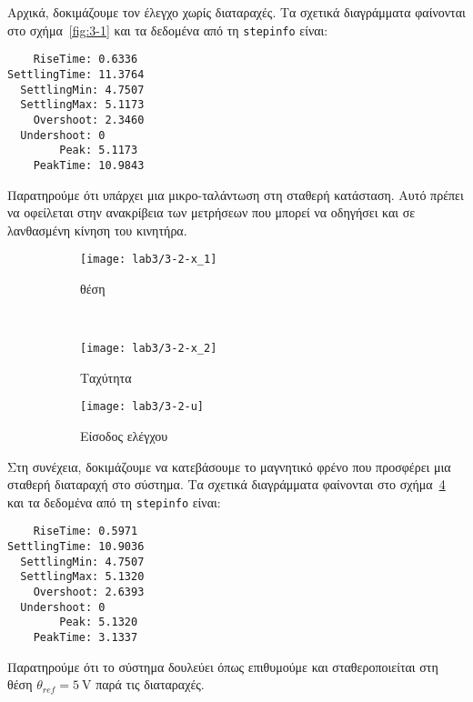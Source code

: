 Αρχικά, δοκιμάζουμε τον έλεγχο χωρίς διαταραχές.
Τα σχετικά διαγράμματα φαίνονται στο σχήμα~\ref{fig:3-1} και τα δεδομένα από τη \texttt{stepinfo} είναι:
\begin{code}
\begin{verbatim}
    RiseTime: 0.6336
SettlingTime: 11.3764
  SettlingMin: 4.7507
  SettlingMax: 5.1173
    Overshoot: 2.3460
  Undershoot: 0
        Peak: 5.1173
    PeakTime: 10.9843
\end{verbatim}
\end{code}
Παρατηρούμε ότι υπάρχει μια μικρο-ταλάντωση στη σταθερή κατάσταση.
Αυτό πρέπει να οφείλεται στην ανακρίβεια των μετρήσεων που μπορεί να οδηγήσει και σε λανθασμένη κίνηση του κινητήρα.

\begin{figure}[htbp]
  \centering
  \begin{subfigure}[t]{\linewidth}
    \texttt{[image: lab3/3-2-x\_1]}
    \caption{θέση}
    \label{fig:3-2-x_1}
  \end{subfigure}\\
  \begin{subfigure}[t]{0.45\linewidth}
    \texttt{[image: lab3/3-2-x\_2]}
    \caption{Ταχύτητα}
    \label{fig:3-2-x_2}
  \end{subfigure}\hfill
  \begin{subfigure}[t]{0.45\linewidth}
    \texttt{[image: lab3/3-2-u]}
    \caption{Είσοδος ελέγχου}
    \label{fig:3-2-u}
  \end{subfigure}
  \caption[]{}
  \label{fig:3-2}
\end{figure}

Στη συνέχεια, δοκιμάζουμε να κατεβάσουμε το μαγνητικό φρένο που προσφέρει μια σταθερή διαταραχή στο σύστημα.
Τα σχετικά διαγράμματα φαίνονται στο σχήμα~\ref{fig:3-2} και τα δεδομένα από τη \texttt{stepinfo} είναι:
\begin{code}
\begin{verbatim}
    RiseTime: 0.5971
SettlingTime: 10.9036
  SettlingMin: 4.7507
  SettlingMax: 5.1320
    Overshoot: 2.6393
  Undershoot: 0
        Peak: 5.1320
    PeakTime: 3.1337
\end{verbatim}
\end{code}
Παρατηρούμε ότι το σύστημα δουλεύει όπως επιθυμούμε και σταθεροποιείται στη θέση $\theta_{ref} = \SI{5}{\volt}$ παρά τις διαταραχές.

